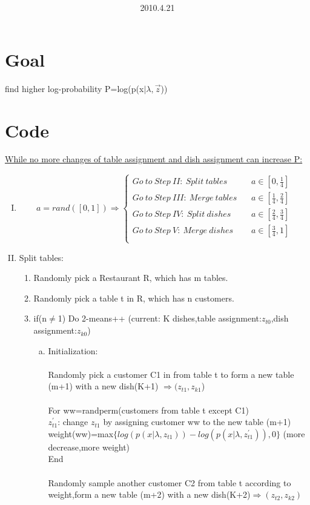\documentclass{article}
\title{\vspace{0.3in}\textmd{\textbf{\hmwkTitle}}}
\date{2010.4.21}
\author{\textbf{\hmwkAuthorName}}
\begin{document}
\begin{spacing}{1.1}
\maketitle


\section*{Goal} find higher log-probability P=log(p(x$|\lambda,\vec z$))
\section*{Code}
\underline{While no more changes of table assignment and dish assignment can increase P:}\\
\begin{enumerate}[(I)]

\item
 \[
a=rand([0,1]) \Rightarrow
  \left\{ \begin{array}{ll}
 Go \ to\  Step \  II: \ Split \ tables & \ \mbox{ ${a \in [0,\frac{1}{4}]}$}\\
 Go \ to\  Step \  III: \ Merge \ tables  & \ \mbox{ ${a \in [\frac{1}{4},\frac{2}{4}]}$}\\
Go \ to\  Step \  IV: \ Split \ dishes  & \ \mbox{ ${a \in [\frac{2}{4},\frac{3}{4}]}$}\\
Go \ to\  Step \  V: \ Merge \ dishes  & \ \mbox{ ${a \in [\frac{3}{4},1]}$}\\
\end{array} \right.  \]
\item Split tables:
\begin{enumerate}[(1)] 
\item Randomly pick a Restaurant R, which has m tables.
\item Randomly pick a table t in R, which has n customers.
\item if(n$\neq$1) Do 2-means++ (current: K dishes,table assignment:$z_{t0}$,dish assignment:$z_{k0}$)
\begin{enumerate}[(a)]
\item Initialization:\\ \\
Randomly pick a customer C1 in from table t to form a new table (m+1) with a new dish(K+1) $\Rightarrow (z_{t1},z_{k1}$) \\ \\
For ww=randperm(customers from table t except C1) \\ 
$z_{t1}^{'}$: change $z_{t1}$ by assigning customer ww to the new table (m+1) \\
weight(ww)=max$\{log(p(x|\lambda,z_{t1}))-log(p(x|\lambda,z_{t1}^{'})),0\}$   (more decrease,more weight) \\ 
End \\ \\
Randomly sample another customer C2 from table t according to weight,form a new table (m+2) with a new dish(K+2)$\Rightarrow(z_{t2},z_{k2})$\\ \\


\end{enumerate}
\end{enumerate}
\end{enumerate}
\end{spacing}
\end{document}
